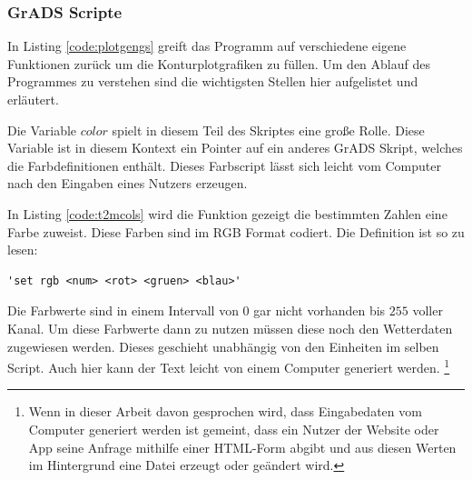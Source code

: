 \subsubsection*{GrADS Scripte}


In Listing \ref{code:plotgengs} greift das Programm auf verschiedene eigene
Funktionen zurück um die Konturplotgrafiken zu füllen.
Um den Ablauf des Programmes zu verstehen sind die wichtigsten Stellen hier aufgelistet und erläutert.

Die Variable $color$ spielt in diesem Teil des Skriptes eine große Rolle.
Diese Variable ist in diesem Kontext ein Pointer auf ein anderes GrADS Skript,
welches die Farbdefinitionen enthält.
Dieses Farbscript lässt sich leicht vom Computer nach den Eingaben eines Nutzers erzeugen.

In Listing \ref{code:t2mcols} wird die Funktion gezeigt die bestimmten Zahlen eine Farbe zuweist.
Diese Farben sind im RGB Format codiert.
Die Definition ist so zu lesen:

\begin{lstlisting}[language=grads]
	'set rgb <num> <rot> <gruen> <blau>'
\end{lstlisting}

Die Farbwerte sind in einem Intervall von $0$ gar nicht vorhanden bis $255$ voller Kanal.
Um diese Farbwerte dann zu nutzen müssen diese noch den Wetterdaten zugewiesen werden.
Dieses geschieht unabhängig von den Einheiten im selben Script.
Auch hier kann der Text leicht von einem Computer generiert werden.
\footnote{Wenn in dieser Arbeit davon gesprochen wird, dass Eingabedaten vom Computer
generiert werden ist gemeint,
dass ein Nutzer der Website oder App seine Anfrage mithilfe einer HTML-Form abgibt
und aus diesen Werten im Hintergrund eine Datei erzeugt oder geändert wird.}


